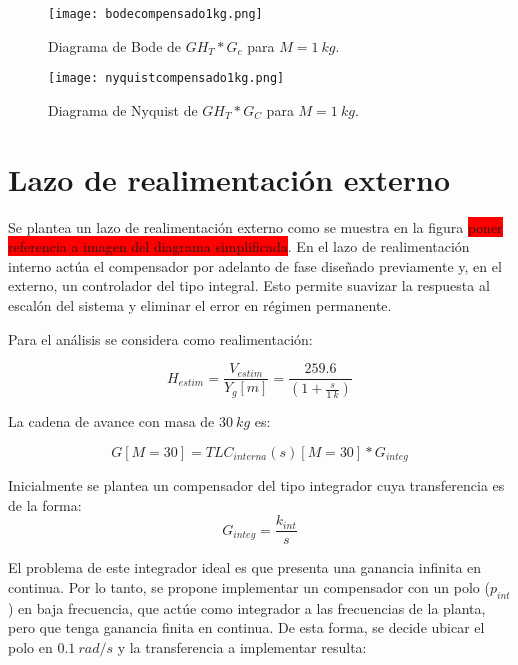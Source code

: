 \begin{figure}[H]
	\centering
	\texttt{[image: bodecompensado1kg.png]}
	\caption{Diagrama de Bode de $GH_T*G_c$ para $M=1\:kg$.}
	\label{fig:bode-analog-para-M-1Kg}
\end{figure}

\begin{figure}[H]
	\centering
	\texttt{[image: nyquistcompensado1kg.png]}
	\caption{Diagrama de Nyquist de $GH_T*G_C$ para $M=1\:kg$.}
	\label{fig:nyquist-analog-para-M-1Kg}
\end{figure}




\section{Lazo de realimentación externo}

\noindent Se plantea un lazo de realimentación externo como se muestra en la  figura \colorbox{red}{poner referencia a imagen del diagrama simplificada}. En el lazo de realimentación interno actúa el compensador por adelanto de fase diseñado previamente y, en el externo, un controlador del tipo integral. Esto permite suavizar la respuesta al escalón del sistema y eliminar el error en régimen permanente.


\noindent Para el an\'{a}lisis se considera como realimentaci\'{o}n: 

\[H_{estim}=\frac{V_{estim}}{Y_g[m]}= \frac{259.6}{(1 + \frac{s}{1\:k})
}\] 

\noindent La cadena de avance con masa de $30\:kg$ es:

\begin{equation} \label{eq_cadena_avance_integrador}
	G[M=30]=TLC_{interna}(s)[M=30]*G_{integ}
\end{equation}


Inicialmente se plantea un compensador del tipo integrador cuya transferencia es de la forma:
\begin{equation}
	G_{integ}= \frac{k_{int}}{s}
\end{equation}

El problema de este integrador ideal es que presenta una ganancia infinita en continua. Por lo tanto, se propone implementar un compensador con un polo ($p_{int}$) en baja frecuencia, que actúe como integrador a las frecuencias de la planta, pero que tenga ganancia finita en continua. De esta forma, se decide ubicar el polo en $0.1\:rad/s$ y la transferencia a implementar resulta:

